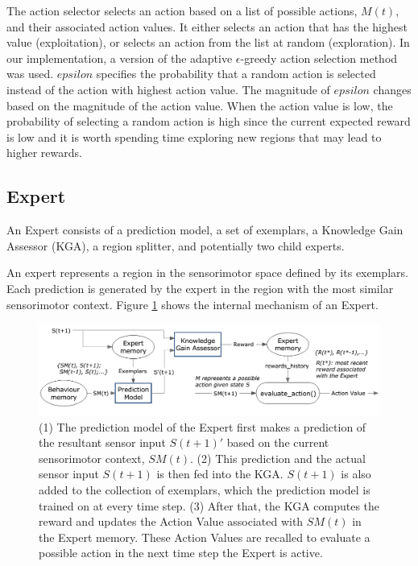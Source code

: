 The action selector selects an action based on a list of possible actions, $M(t)$, and their associated action values. It either selects an action that has the highest value (exploitation), or selects an action from the list at random (exploration). In our implementation, a version of the adaptive $\epsilon$-greedy \cite{Tokic2010} action selection method was used. $epsilon$ specifies the probability that a random action is selected instead of the action with highest action value. The magnitude of $epsilon$ changes based on the magnitude of the action value. When the action value is low, the probability of selecting a random action is high since the current expected reward is low and it is worth spending time exploring new regions that may lead to higher rewards.

\subsection{Expert}

An Expert consists of a prediction model, a set of exemplars, a Knowledge Gain Assessor (KGA), a region splitter, and potentially two child experts. 

An expert represents a region in the sensorimotor space defined by its exemplars. Each prediction is generated by the expert in the region with the most similar sensorimotor context. Figure \ref{fig:Block Diagram Expert} shows the internal mechanism of an Expert.

\begin{figure}[!htbp]
	\centering
	\includegraphics[width=1.0 \textwidth]{"fig/cbla/Block Diagram Expert"}
	\caption[Block diagram of the Expert]{(1) The prediction model of the Expert first makes a prediction of the resultant sensor input $S(t+1)'$ based on the current sensorimotor context, $SM(t)$. (2) This prediction and the actual sensor input $S(t+1)$ is then fed into the KGA. $S(t+1)$ is also added to the collection of exemplars, which the prediction model is trained on at every time step. (3) After that, the KGA computes the reward and updates the Action Value associated with $SM(t)$ in the Expert memory. These Action Values are recalled to evaluate a possible action in the next time step the Expert is active.}
	\label{fig:Block Diagram Expert}
\end{figure}

